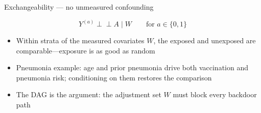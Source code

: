 \documentclass[aspectratio=169,10pt]{beamer}
\newcommand{\indep}{\perp\!\!\!\perp}
\begin{document}
\begin{frame}[t]{Exchangeability --- no unmeasured confounding}
  \vspace*{0.35cm}

  \[
    Y^{(a)} \indep A \mid W
    \qquad \text{for } a \in \{0, 1\}
  \]

  \vspace{0.3em}
  \begin{itemize}
    \item Within strata of the measured covariates \(W\), the exposed and
      unexposed are comparable---exposure is as good as random
    \item Pneumonia example: age and prior pneumonia drive both
      vaccination and pneumonia risk; conditioning on them restores the
      comparison
    \item The DAG is the argument: the adjustment set \(W\) must block
      every backdoor path
  \end{itemize}

  \vspace{0.6em}
  \begin{center}
  \end{center}
\end{frame}
\end{document}
